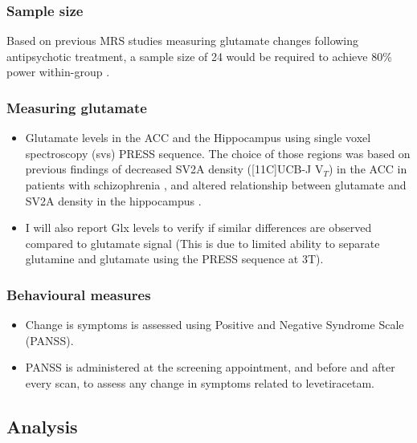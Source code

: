 \documentclass[
  letterpaper,
  DIV=11,
  numbers=noendperiod]{scrartcl}
\providecommand{\tightlist}{%
  \setlength{\itemsep}{0pt}\setlength{\parskip}{0pt}}\usepackage{longtable,booktabs,array}
\begin{document}
\subsubsection{Sample size}\label{sample-size}

Based on previous MRS studies measuring glutamate changes following
antipsychotic treatment, a sample size of 24 would be required to
achieve 80\% power within-group \autocite{egerton_effects_2017}.

\subsubsection{Measuring glutamate}\label{measuring-glutamate}

\begin{itemize}
\tightlist
\item
  Glutamate levels in the ACC and the Hippocampus using single voxel
  spectroscopy (svs) PRESS sequence. The choice of those regions was
  based on previous findings of decreased SV2A density ({[}11C{]}UCB-J
  V\(_T\)) in the ACC in patients with schizophrenia
  \autocite{onwordi_synaptic_2020}, and altered relationship between
  glutamate and SV2A density in the hippocampus
  \autocite{onwordi_relationship_2021}.
\item
  I will also report Glx levels to verify if similar differences are
  observed compared to glutamate signal (This is due to limited ability
  to separate glutamine and glutamate using the PRESS sequence at 3T).
\end{itemize}

\subsubsection{Behavioural measures}\label{behavioural-measures}

\begin{itemize}
\tightlist
\item
  Change is symptoms is assessed using Positive and Negative Syndrome
  Scale (PANSS).
\item
  PANSS is administered at the screening appointment, and before and
  after every scan, to assess any change in symptoms related to
  levetiracetam.
\end{itemize}

\subsection{Analysis}\label{analysis}
\end{document}

